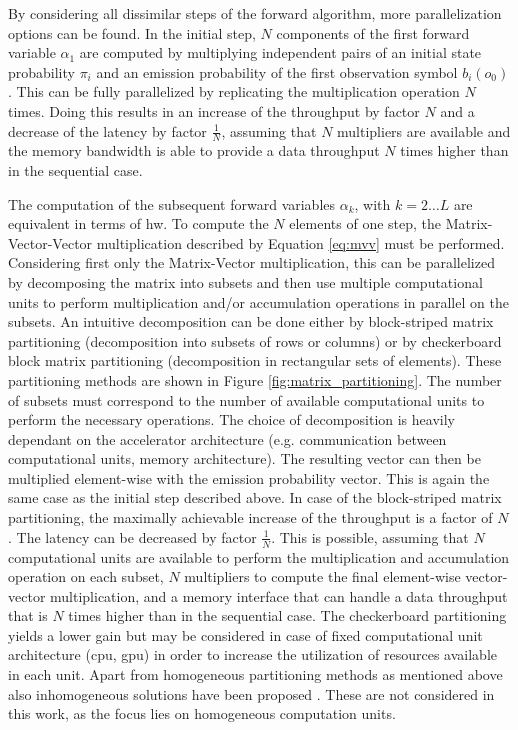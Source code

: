 \documentclass[mscthesis]{usiinfthesis}
\begin{document}
By considering all dissimilar steps of the forward algorithm, more
parallelization options can be found. In the initial step, $N$ components of
the first forward variable $\alpha_1$ are computed by multiplying independent
pairs of an initial state probability $\pi_i$ and an emission probability of
the first observation symbol $b_i(o_0)$. This can be fully parallelized by
replicating the multiplication operation $N$ times. Doing this results in an
increase of the throughput by factor $N$ and a decrease of the latency by
factor $\frac{1}{N}$, assuming that $N$ multipliers are available and the
memory bandwidth is able to provide a data throughput $N$ times higher than in
the sequential case.

The computation of the subsequent forward variables $\alpha_k$, with $k
= 2 \dots L$ are equivalent in terms of \gls{hw}. To compute the $N$ elements
of one step, the Matrix-Vector-Vector multiplication described by Equation
\ref{eq:mvv} must be performed. Considering first only the Matrix-Vector
multiplication, this can be parallelized by decomposing the matrix into subsets
and then use multiple computational units to perform multiplication and/or
accumulation operations in parallel on the subsets. An intuitive decomposition
can be done either by block-striped matrix partitioning (decomposition into
subsets of rows or columns) or by checkerboard block matrix partitioning
(decomposition in rectangular sets of elements). These partitioning methods are
shown in Figure \ref{fig:matrix_partitioning}. The number of subsets must
correspond to the number of available computational units to perform the
necessary operations. The choice of decomposition is heavily dependant on the
accelerator architecture (e.g. communication between computational units,
memory architecture). The resulting vector can then be multiplied element-wise
with the emission probability vector. This is again the same case as the
initial step described above. In case of the block-striped matrix partitioning,
the maximally achievable increase of the throughput is a factor of $N$. The
latency can be decreased by factor $\frac{1}{N}$. This is possible, assuming
that $N$ computational units are available to perform the multiplication and
accumulation operation on each subset, $N$ multipliers to compute the final
element-wise vector-vector multiplication, and a memory interface that can
handle a data throughput that is $N$ times higher than in the sequential case.
The checkerboard partitioning yields a lower gain but may be considered in case
of fixed computational unit architecture (\gls{cpu}, \gls{gpu}) in order to
increase the utilization of resources available in each unit. Apart from
homogeneous partitioning methods as mentioned above also inhomogeneous
solutions have been proposed \cite{IPDPSW12_DeFlumere, clarke11}.  These are
not considered in this work, as the focus lies on homogeneous computation
units.
\end{document}
